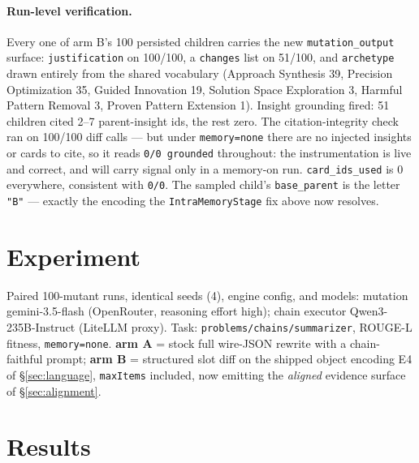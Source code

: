 \documentclass[11pt]{article}
\newcommand{\armA}{\textcolor{bad}{arm A}}
\newcommand{\armB}{\textcolor{accent}{arm B}}
\begin{document}
\paragraph{Run-level verification.} Every one of \armB's 100 persisted children carries the
new \texttt{mutation\_output} surface: \texttt{justification} on 100/100, a \texttt{changes}
list on 51/100, and \texttt{archetype} drawn entirely from the shared vocabulary (Approach
Synthesis 39, Precision Optimization 35, Guided Innovation 19, Solution Space Exploration 3,
Harmful Pattern Removal 3, Proven Pattern Extension 1). Insight grounding fired: 51 children
cited 2--7 parent-insight ids, the rest zero. The citation-integrity check ran on 100/100
diff calls --- but under \texttt{memory=none} there are no injected insights or cards to
cite, so it reads \texttt{0/0 grounded} throughout: the instrumentation is live and correct,
and will carry signal only in a memory-on run. \texttt{card\_ids\_used} is 0 everywhere,
consistent with \texttt{0/0}. The sampled child's \texttt{base\_parent} is the letter
\texttt{"B"} --- exactly the encoding the \texttt{IntraMemoryStage} fix above now resolves.

\section{Experiment}
\label{sec:experiment}
Paired 100-mutant runs, identical seeds (4), engine config, and models: mutation
gemini-3.5-flash (OpenRouter, reasoning effort high); chain executor Qwen3-235B-Instruct
(LiteLLM proxy). Task: \texttt{problems/chains/summarizer}, ROUGE-L fitness,
\texttt{memory=none}.
\textbf{\armA{}} = stock full wire-JSON rewrite with a chain-faithful prompt;
\textbf{\armB{}} = structured slot diff on the shipped object encoding E4 of
\S\ref{sec:language}, \texttt{maxItems} included, now emitting the \emph{aligned} evidence
surface of \S\ref{sec:alignment}.

\section{Results}
\end{document}
